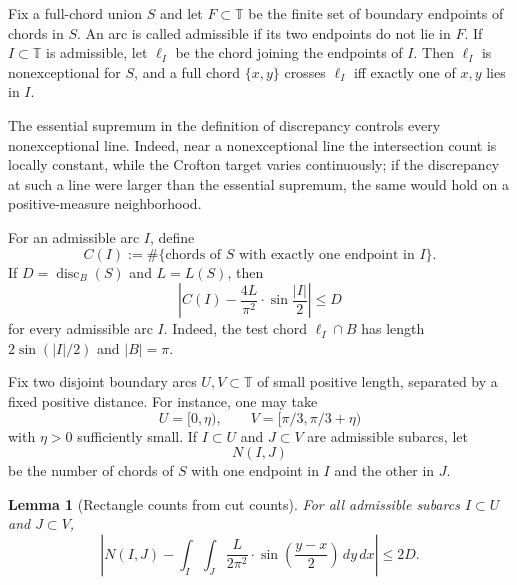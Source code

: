 \documentclass[11pt]{article}
\newtheorem{lemma}[theorem]{Lemma}
\theoremstyle{definition}
\newcommand{\T}{\mathbb T}
\newcommand{\disc}{\operatorname{disc}}
\begin{document}
\bigskip
\noindent
Fix a full-chord union $S$ and let $F\subset\T$ be the finite set of boundary endpoints of chords in $S$.  An arc is called admissible if its two endpoints do not lie in $F$.  If $I\subset\T$ is admissible, let $\ell_I$ be the chord joining the endpoints of $I$.  Then $\ell_I$ is nonexceptional for $S$, and a full chord $\{x,y\}$ crosses $\ell_I$ iff exactly one of $x,y$ lies in $I$.

\bigskip
\noindent
The essential supremum in the definition of discrepancy controls every nonexceptional line.  Indeed, near a nonexceptional line the intersection count is locally constant, while the Crofton target varies continuously; if the discrepancy at such a line were larger than the essential supremum, the same would hold on a positive-measure neighborhood.

\bigskip
\noindent
For an admissible arc $I$, define
\[
        C(I):=\#\{\text{chords of }S\text{ with exactly one endpoint in }I\}.
\]
If $D=\disc_B(S)$ and $L=L(S)$, then
\begin{equation}\label{eq:cut-disc}
        \left|C(I)-\frac{4L}{\pi^2}\cdot\sin\frac{|I|}{2}\right|
        \le D
\end{equation}
for every admissible arc $I$.  Indeed, the test chord $\ell_I\cap B$ has length $2\sin(|I|/2)$ and $|B|=\pi$.

\bigskip
\noindent
Fix two disjoint boundary arcs $U,V\subset\T$ of small positive length, separated by a fixed positive distance.  For instance, one may take
\[
        U=[0,\eta),
        \qquad
        V=[\pi/3,\pi/3+\eta)
\]
with $\eta>0$ sufficiently small.  If $I\subset U$ and $J\subset V$ are admissible subarcs, let
\[
        N(I,J)
\]
be the number of chords of $S$ with one endpoint in $I$ and the other in $J$.

\begin{lemma}[Rectangle counts from cut counts]\label{lem:rectangle-from-cuts}
For all admissible subarcs $I\subset U$ and $J\subset V$,
\[
        \left|
        N(I,J)-
        \int_I\int_J \frac{L}{2\pi^2}\cdot\sin\left(\frac{y-x}{2}\right)\,dy\,dx
        \right|
        \le 2D.
\]
\end{lemma}
\end{document}

